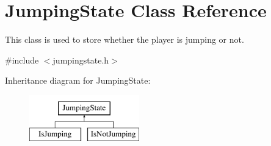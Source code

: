 \hypertarget{classJumpingState}{\section{Jumping\-State Class Reference}
\label{classJumpingState}
}


This class is used to store whether the player is jumping or not.  




{\ttfamily \#include $<$jumpingstate.\-h$>$}

Inheritance diagram for Jumping\-State\-:\begin{figure}[H]
\begin{center}
\leavevmode
\includegraphics[height=2.000000cm]{classJumpingState}
\end{center}
\end{figure}
